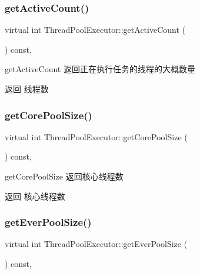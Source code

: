 \subsubsection{\texorpdfstring{get\+Active\+Count()}{getActiveCount()}}
{\footnotesize\ttfamily virtual int Thread\+Pool\+Executor\+::get\+Active\+Count (\begin{DoxyParamCaption}{ }\end{DoxyParamCaption}) const\hspace{0.3cm}{\ttfamily [final]}, {\ttfamily [virtual]}}



get\+Active\+Count 返回正在执行任务的线程的大概数量 

\begin{DoxyReturn}{返回}
线程数 
\end{DoxyReturn}
\mbox{\label{classThreadPoolExecutor_af29377a50af53031bb06aeacf9ef27f7}} 
\subsubsection{\texorpdfstring{get\+Core\+Pool\+Size()}{getCorePoolSize()}}
{\footnotesize\ttfamily virtual int Thread\+Pool\+Executor\+::get\+Core\+Pool\+Size (\begin{DoxyParamCaption}{ }\end{DoxyParamCaption}) const\hspace{0.3cm}{\ttfamily [final]}, {\ttfamily [virtual]}}



get\+Core\+Pool\+Size 返回核心线程数 

\begin{DoxyReturn}{返回}
核心线程数 
\end{DoxyReturn}
\mbox{\label{classThreadPoolExecutor_af630e5117b4f67428a4fcbee5c15a7d9}} 
\subsubsection{\texorpdfstring{get\+Ever\+Pool\+Size()}{getEverPoolSize()}}
{\footnotesize\ttfamily virtual int Thread\+Pool\+Executor\+::get\+Ever\+Pool\+Size (\begin{DoxyParamCaption}{ }\end{DoxyParamCaption}) const\hspace{0.3cm}{\ttfamily [final]}, {\ttfamily [virtual]}}



